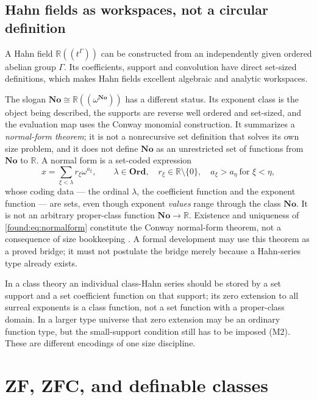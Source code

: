 \documentclass[11pt,letterpaper]{article}
\numberwithin{equation}{section}
\theoremstyle{definition}
\theoremstyle{remark}
\newcommand{\No}{\mathbf{No}}
\newcommand{\Ord}{\mathbf{Ord}}
\newcommand{\R}{\mathbb R}
\begin{document}
\subsection{Hahn fields as workspaces, not a circular definition}
\label{found:sub:hahnworkspace}
A Hahn field $\R((t^\Gamma))$ can be constructed from an independently given
ordered abelian group $\Gamma$. Its coefficients, support and convolution have
direct set-sized definitions, which makes Hahn fields excellent algebraic and
analytic workspaces.

The slogan $\No\cong\R((\omega^{\No}))$ has a different status. Its exponent
class is the object being described, the supports are reverse well ordered and
set-sized, and the evaluation map uses the Conway monomial construction. It
summarizes a \emph{normal-form theorem}; it is not a nonrecursive set
definition that solves its own size problem, and it does not define $\No$ as an
unrestricted set of functions from $\No$ to $\R$. A normal form is a set-coded
expression
\begin{equation}\label{found:eq:normalform}
 x=\sum_{\xi<\lambda}r_\xi\omega^{a_\xi},\qquad
 \lambda\in\Ord,\quad r_\xi\in\R\setminus\{0\},\quad
 a_\xi>a_\eta\ \text{for }\xi<\eta,
\end{equation}
whose coding data --- the ordinal $\lambda$, the coefficient function and the
exponent function --- are sets, even though exponent \emph{values} range through
the class $\No$. It is not an arbitrary proper-class function $\No\to\R$.
Existence and uniqueness of \eqref{found:eq:normalform} constitute the Conway
normal-form theorem, not a consequence of size bookkeeping
\cite{found:Conway,found:Gonshor}. A formal development may use this theorem as
a proved bridge; it must not postulate the bridge merely because a Hahn-series
type already exists.

In a class theory an individual class-Hahn series should be stored by a set
support and a set coefficient function on that support; its zero extension to
all surreal exponents is a class function, not a set function with a
proper-class domain. In a larger type universe that zero extension may be an
ordinary function type, but the small-support condition still has to be imposed
(M2). These are different encodings of one size discipline.

\section{ZF, ZFC, and definable classes}
\label{found:sec:zfc}
\end{document}
